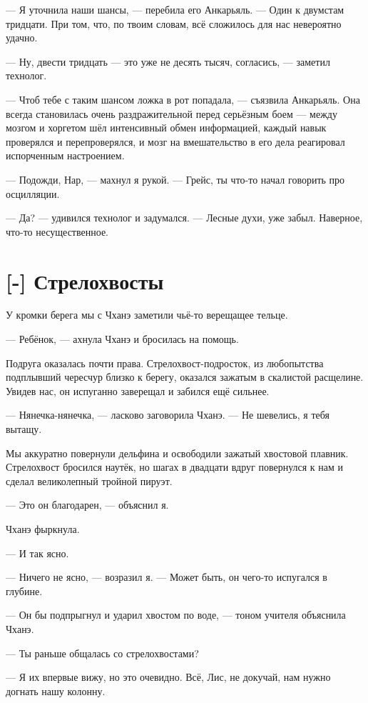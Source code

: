 --- Я уточнила наши шансы, --- перебила его Анкарьяль.
--- Один к двумстам тридцати.
При том, что, по твоим словам, всё сложилось для нас невероятно удачно.

--- Ну, двести тридцать --- это уже не десять тысяч, согласись, --- заметил технолог.

--- Чтоб тебе с таким шансом ложка в рот попадала, --- съязвила Анкарьяль.
Она всегда становилась очень раздражительной перед серьёзным боем --- между мозгом и хоргетом шёл интенсивный обмен информацией, каждый навык проверялся и перепроверялся, и мозг на вмешательство в его дела реагировал испорченным настроением.

--- Подожди, Нар, --- махнул я рукой.
--- Грейс, ты что-то начал говорить про осцилляции.

--- Да? --- удивился технолог и задумался.
--- Лесные духи, уже забыл.
Наверное, что-то несущественное.

\section{[-] Стрелохвосты}

У кромки берега мы с Чханэ заметили чьё-то верещащее тельце.

--- Ребёнок, --- ахнула Чханэ и бросилась на помощь.

Подруга оказалась почти права.
Стрелохвост-подросток, из любопытства подплывший чересчур близко к берегу, оказался зажатым в скалистой расщелине.
Увидев нас, он испуганно заверещал и забился ещё сильнее.

--- Нянечка-нянечка, --- ласково заговорила Чханэ.
--- Не шевелись, я тебя вытащу.

Мы аккуратно повернули дельфина и освободили зажатый хвостовой плавник.
Стрелохвост бросился наутёк, но шагах в двадцати вдруг повернулся к нам и сделал великолепный тройной пируэт.

--- Это он благодарен, --- объяснил я.

Чханэ фыркнула.

--- И так ясно.

--- Ничего не ясно, --- возразил я.
--- Может быть, он чего-то испугался в глубине.

--- Он бы подпрыгнул и ударил хвостом по воде, --- тоном учителя объяснила Чханэ.

--- Ты раньше общалась со стрелохвостами?

--- Я их впервые вижу, но это очевидно.
Всё, Лис, не докучай, нам нужно догнать нашу колонну.

